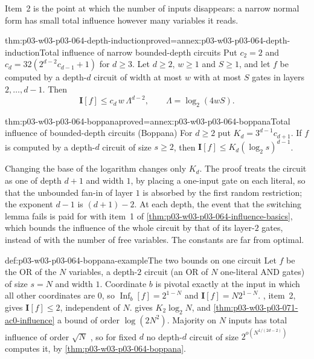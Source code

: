 Item~2 is the point at which the number of inputs disappears: a narrow
normal form has small total influence however many variables it reads.

\begin{hbtheorem}{thm:p03-w03-p03-064-depth-induction}{proved=annex:p03-w03-p03-064-depth-induction}{Total influence of narrow bounded-depth circuits}
Put \(c_2=2\) and \(c_d=32(2^{d-2}c_{d-1}+1)\) for \(d\geq3\).  Let
\(d\geq2\), \(w\geq1\) and \(S\geq1\), and let \(f\) be computed by a
depth-\(d\) circuit of width at most \(w\) with at most \(S\) gates in
layers \(2,\ldots,d-1\).  Then
\[
  \mathbf I[f]\leq c_d\,w\,\Lambda^{d-2},\qquad \Lambda=\log_2(4wS).
\]
\end{hbtheorem}

\begin{hbtheorem}{thm:p03-w03-p03-064-boppana}{proved=annex:p03-w03-p03-064-boppana}{Total influence of bounded-depth circuits (Boppana)}
For \(d\geq2\) put \(K_d=3^{d-1}c_{d+1}\).  If \(f\) is computed by a
depth-\(d\) circuit of size \(s\geq2\), then
\(\mathbf I[f]\leq K_d(\log_2s)^{d-1}\).
\end{hbtheorem}

Changing the base of the logarithm changes only \(K_d\).  The proof treats
the circuit as one of depth \(d+1\) and width \(1\), by placing a one-input
gate on each literal, so that the unbounded fan-in of layer \(1\) is
absorbed by the first random restriction; the exponent \(d-1\) is
\((d+1)-2\).  At each depth, the event that the switching lemma fails is paid
for with item~1 of \cref{thm:p03-w03-p03-064-influence-basics}, which bounds
the influence of the whole circuit by that of its layer-\(2\) gates, instead
of with the number of free variables.  The constants are far from optimal.

\begin{hbexample}{def:p03-w03-p03-064-boppana-example}{The two bounds on one circuit}
Let \(f\) be the OR of the \(N\) variables, a depth-\(2\) circuit (an OR of
\(N\) one-literal AND gates) of size \(s=N\) and width \(1\).  Coordinate
\(b\) is pivotal exactly at the input in which all other coordinates are
\(0\), so \(\operatorname{Inf}_b[f]=2^{1-N}\) and
\(\mathbf I[f]=N2^{1-N}\).  ,
item~2, gives \(\mathbf I[f]\leq2\), independent of \(N\).
 gives \(K_2\log_2N\), and
\cref{thm:p03-w03-p03-071-ac0-influence} a bound of order \(\log(2N^2)\).
Majority on \(N\) inputs has total influence of order \(\sqrt N\)
\cite[p.~107]{ODonnell2021AnalysisBooleanArxiv}, so for fixed \(d\) no
depth-\(d\) circuit of size \(2^{o(N^{1/(2d-2)})}\) computes it, by
\cref{thm:p03-w03-p03-064-boppana}.
\end{hbexample}

